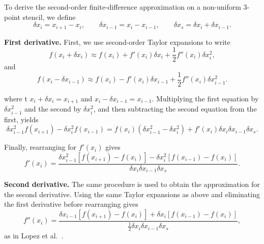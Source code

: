 \documentclass[11pt,a4paper]{article}
\begin{document}
To derive the second-order finite-difference approximation on a non-uniform
3-point stencil, we define
\[
\delta x_i=x_{i+1}-x_i,
\qquad
\delta x_{i-1}=x_i-x_{i-1},
\qquad
\delta x_s=\delta x_i+\delta x_{i-1}.
\]

\textbf{First derivative.}
First, we use second-order Taylor expansions to write
\begin{equation}
    f(x_i+\delta x_i)
    \approx
    f(x_i)
    +f'(x_i)\delta x_i
    +\frac{1}{2}f''(x_i)\delta x_i^2,
\end{equation}
and
\begin{equation}
    f(x_i-\delta x_{i-1})
    \approx
    f(x_i)
    -f'(x_i)\delta x_{i-1}
    +\frac{1}{2}f''(x_i)\delta x_{i-1}^2.
\end{equation}

where t $x_i+\delta x_i=x_{i+1}$ and
$x_i-\delta x_{i-1}=x_{i-1}$. Multiplying the first equation by
$\delta x_{i-1}^2$ and the second by $\delta x_i^2$, and then
subtracting the second equation from the first, yields
\begin{equation}
    \delta x_{i-1}^2 f(x_{i+1})
    -\delta x_i^2 f(x_{i-1})
    =
    f(x_i)
    \left(\delta x_{i-1}^2-\delta x_i^2\right)
    +
    f'(x_i)\delta x_i\delta x_{i-1}\delta x_s.
\end{equation}

Finally, rearranging for $f'(x_i)$ gives
\begin{equation}
    f'(x_i)
    =
    \frac{
        \delta x_{i-1}^2
        \left[f(x_{i+1})-f(x_i)\right]
        -
        \delta x_i^2
        \left[f(x_{i-1})-f(x_i)\right]
    }{
        \delta x_i\delta x_{i-1}\delta x_s
    }.
\end{equation}

\textbf{Second derivative.}
The same procedure is used to obtain the approximation for the second
derivative. Using the same Taylor expansions as above and eliminating
the first derivative before rearranging gives
\begin{equation}
    f''(x_i)
    =
    \frac{
        \delta x_{i-1}
        \left[f(x_{i+1})-f(x_i)\right]
        +
        \delta x_i
        \left[f(x_{i-1})-f(x_i)\right]
    }{
        \frac{1}{2}\delta x_i\delta x_{i-1}\delta x_s
    },
\end{equation}
as in Lopez et al.~\cite{lopez2019}.
\end{document}
